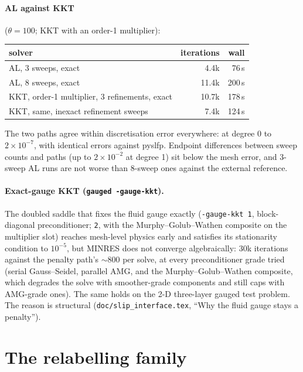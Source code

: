 \documentclass[11pt]{article}
\numberwithin{equation}{section}
\newcommand{\code}[1]{\texttt{#1}}
\begin{document}
\paragraph{AL against KKT} ($\theta=100$; KKT with an order-1 multiplier):
\begin{center}
\small
\begin{tabular}{@{}lrr@{}}
\toprule
solver & iterations & wall \\
\midrule
AL, 3 sweeps, exact & 4.4k & 76\,s \\
AL, 8 sweeps, exact & 11.4k & 200\,s \\
KKT, order-1 multiplier, 3 refinements, exact & 10.7k & 178\,s \\
KKT, same, inexact refinement sweeps & 7.4k & 124\,s \\
\bottomrule
\end{tabular}
\end{center}
The two paths agree within discretisation error everywhere: at degree 0
to $2\times10^{-7}$, with identical errors against pyslfp. Endpoint
differences between sweep counts and paths (up to $2\times10^{-2}$ at
degree 1) sit below the mesh error, and 3-sweep AL runs are not worse
than 8-sweep ones against the external reference.

\paragraph{Exact-gauge KKT (\code{gauged -gauge-kkt}).} The doubled saddle
that fixes the fluid gauge exactly (\code{-gauge-kkt 1}, block-diagonal
preconditioner; \code{2}, with the Murphy--Golub--Wathen composite
\cite{MurphyGolubWathen2000} on the multiplier slot) reaches mesh-level
physics early and satisfies its stationarity condition to $10^{-5}$, but
MINRES does not converge algebraically: 30k iterations against the
penalty path's $\sim800$ per solve, at every preconditioner grade tried
(serial Gauss--Seidel, parallel AMG, and the Murphy--Golub--Wathen
composite, which degrades the solve with smoother-grade components and
still caps with AMG-grade ones). The same holds on the 2-D three-layer
gauged test problem. The reason is structural
(\code{doc/slip\_interface.tex}, ``Why the fluid gauge stays a penalty'').

\section{The relabelling family}
\label{sec:relabel}
\end{document}

